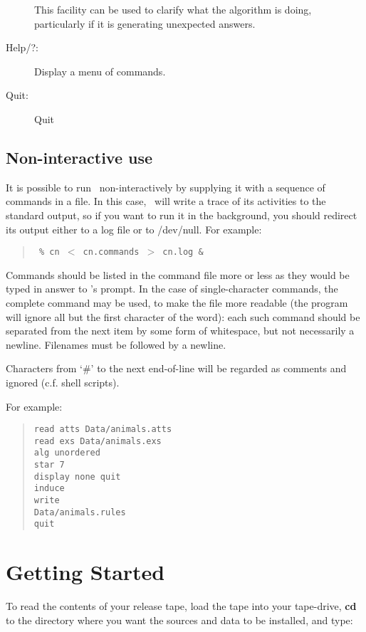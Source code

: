 \begin{description}
This facility
can be used to clarify what the algorithm is doing, particularly
if it is generating unexpected answers.  

\item[Help/?:]  Display a menu of commands.

\item[Quit:]  Quit
\end{description}


\subsection{Non-interactive use}
It is possible to run \CN\ non-interactively by supplying it
with a sequence of commands in a file.  In this case, \CN\ will write
a trace of its activities to the standard output, so if you want 
to run it in the background, you should redirect its output
either to a log file or to /dev/null.  For example:

\vspace{-3ex}
\begin{quotation} \tt
\%\ cn $<$ cn.commands $>$ cn.log \&
\end{quotation}


Commands should be listed in the command file more or less as they 
would be typed in answer to \CN's prompt.  In the case of 
single-character commands, the complete command may be used, to
make the file more readable (the program will ignore all but the first
character of the word): each such command should be separated from
the next item by some form of whitespace, but not necessarily
a newline.  Filenames must be followed by a newline. 

Characters from `\#' to the next end-of-line will be regarded as
comments and ignored (c.f. shell scripts).

For example:

\vspace{-6ex}
\begin{quotation} \small \par \noindent
\begin{verbatim}
read atts Data/animals.atts
read exs Data/animals.exs
alg unordered 
star 7
display none quit
induce
write
Data/animals.rules
quit
\end{verbatim}
\end{quotation}
\vspace{-2ex}



  

\appendix
\section{Getting Started}
\label{getting_started}
To read the contents of your release tape, load the tape into your
tape-drive, {\bf cd} to the 
directory where you want the sources and data to be installed,
and type:

